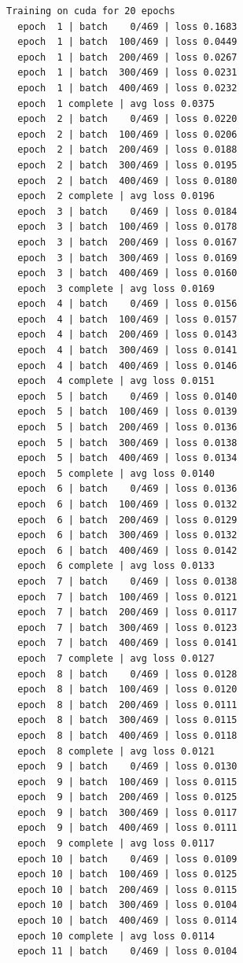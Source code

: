 \documentclass[
  letterpaper,
  DIV=11,
  numbers=noendperiod]{scrartcl}
\begin{document}
\label{task3}
\begin{verbatim}
Training on cuda for 20 epochs
  epoch  1 | batch    0/469 | loss 0.1683
  epoch  1 | batch  100/469 | loss 0.0449
  epoch  1 | batch  200/469 | loss 0.0267
  epoch  1 | batch  300/469 | loss 0.0231
  epoch  1 | batch  400/469 | loss 0.0232
  epoch  1 complete | avg loss 0.0375
  epoch  2 | batch    0/469 | loss 0.0220
  epoch  2 | batch  100/469 | loss 0.0206
  epoch  2 | batch  200/469 | loss 0.0188
  epoch  2 | batch  300/469 | loss 0.0195
  epoch  2 | batch  400/469 | loss 0.0180
  epoch  2 complete | avg loss 0.0196
  epoch  3 | batch    0/469 | loss 0.0184
  epoch  3 | batch  100/469 | loss 0.0178
  epoch  3 | batch  200/469 | loss 0.0167
  epoch  3 | batch  300/469 | loss 0.0169
  epoch  3 | batch  400/469 | loss 0.0160
  epoch  3 complete | avg loss 0.0169
  epoch  4 | batch    0/469 | loss 0.0156
  epoch  4 | batch  100/469 | loss 0.0157
  epoch  4 | batch  200/469 | loss 0.0143
  epoch  4 | batch  300/469 | loss 0.0141
  epoch  4 | batch  400/469 | loss 0.0146
  epoch  4 complete | avg loss 0.0151
  epoch  5 | batch    0/469 | loss 0.0140
  epoch  5 | batch  100/469 | loss 0.0139
  epoch  5 | batch  200/469 | loss 0.0136
  epoch  5 | batch  300/469 | loss 0.0138
  epoch  5 | batch  400/469 | loss 0.0134
  epoch  5 complete | avg loss 0.0140
  epoch  6 | batch    0/469 | loss 0.0136
  epoch  6 | batch  100/469 | loss 0.0132
  epoch  6 | batch  200/469 | loss 0.0129
  epoch  6 | batch  300/469 | loss 0.0132
  epoch  6 | batch  400/469 | loss 0.0142
  epoch  6 complete | avg loss 0.0133
  epoch  7 | batch    0/469 | loss 0.0138
  epoch  7 | batch  100/469 | loss 0.0121
  epoch  7 | batch  200/469 | loss 0.0117
  epoch  7 | batch  300/469 | loss 0.0123
  epoch  7 | batch  400/469 | loss 0.0141
  epoch  7 complete | avg loss 0.0127
  epoch  8 | batch    0/469 | loss 0.0128
  epoch  8 | batch  100/469 | loss 0.0120
  epoch  8 | batch  200/469 | loss 0.0111
  epoch  8 | batch  300/469 | loss 0.0115
  epoch  8 | batch  400/469 | loss 0.0118
  epoch  8 complete | avg loss 0.0121
  epoch  9 | batch    0/469 | loss 0.0130
  epoch  9 | batch  100/469 | loss 0.0115
  epoch  9 | batch  200/469 | loss 0.0125
  epoch  9 | batch  300/469 | loss 0.0117
  epoch  9 | batch  400/469 | loss 0.0111
  epoch  9 complete | avg loss 0.0117
  epoch 10 | batch    0/469 | loss 0.0109
  epoch 10 | batch  100/469 | loss 0.0125
  epoch 10 | batch  200/469 | loss 0.0115
  epoch 10 | batch  300/469 | loss 0.0104
  epoch 10 | batch  400/469 | loss 0.0114
  epoch 10 complete | avg loss 0.0114
  epoch 11 | batch    0/469 | loss 0.0104

\end{verbatim}
\end{document}
